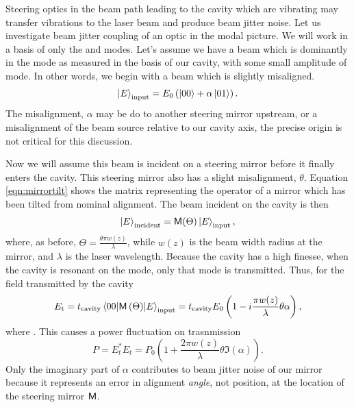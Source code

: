 Steering optics in the beam path leading to the cavity which are vibrating may transfer vibrations to the laser beam and produce beam jitter noise. %
Let us investigate beam jitter coupling of an optic in the modal picture. %
 We will work in a basis of only the  and  modes. %
Let's assume we have a beam which is dominantly in the  mode as measured in the basis of our cavity, with some small amplitude of  mode. %
In other words, we begin with a beam which is slightly misaligned.
\begin{equation}
\left| E \right>_{\text{input}}=E_0\left(\left| 00 \right>+\alpha\left| 01 \right>\right).
\end{equation}
The misalignment, $\alpha$ may be do to another steering mirror upstream, or a misalignment of the beam source relative to our cavity axis, the precise origin is not critical for this discussion.

Now we will assume this beam is incident on a steering mirror before it finally enters the cavity. %
This steering mirror also has a slight misalignment, $\theta$. %
Equation \ref{eqn:mirrortilt} shows the matrix representing the operator of a mirror which has been tilted from nominal alignment. %
The beam incident on the cavity is then
\begin{equation}
\left| E \right>_{\text{incident}}=\mathsf{M}(\Theta)\left| E \right>_{\text{input}},
\end{equation}
where, as before, $\Theta=\frac{\theta \pi w(z)}{\lambda}$, while $w(z)$ is the beam width radius at the mirror, and $\lambda$ is the laser wavelength. %
Because the cavity has a high finesse, when the cavity is resonant on the  mode, only that mode is transmitted. %
Thus, for the field transmitted by the cavity
\begin{equation}
E_{\text{t}}=t_{\text{cavity}}\matrixel{00}{\oper{M}\left(\Theta\right)}{E}_{\text{input}}=t_{\text{cavity}}E_0\left(1-i\frac{ \pi w(z)}{\lambda}\theta\alpha\right),
\end{equation}
where . %
This causes a power fluctuation on trasnmission
\begin{equation}
\label{eqn:mirrorjitter}
P=E_t^*E_t=P_0\left(1+\frac{2\pi w(z)}{\lambda}\theta\Im(\alpha)\right).
\end{equation}
Only the imaginary part of $\alpha$ contributes to beam jitter noise of our mirror because it represents an error in alignment \emph{angle}, not position, at the location of the steering mirror $\mathsf{M}$. %


